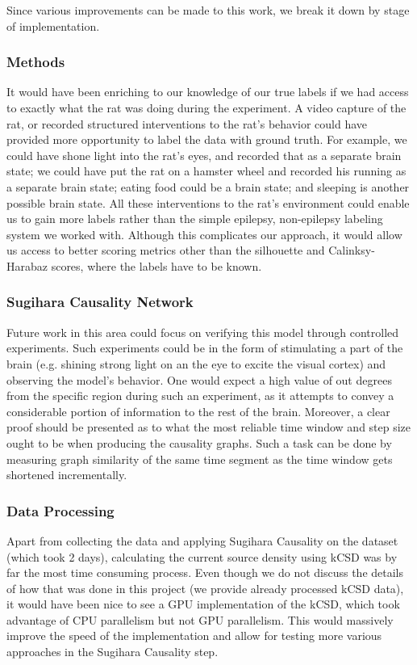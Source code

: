 Since various improvements can be made to this work, we break it down by stage of implementation.

\subsubsection{Methods}
It would have been enriching to our knowledge of our true labels if we had access to exactly what the rat was doing during the experiment. A video capture of the rat, or recorded structured interventions to the rat's behavior could have provided more opportunity to label the data with ground truth. For example, we could have shone light into the rat's eyes, and recorded that as a separate brain state; we could have put the rat on a hamster wheel and recorded his running as a separate brain state; eating food could be a brain state; and sleeping is another possible brain state. All these interventions to the rat's environment could enable us to gain more labels rather than the simple epilepsy, non-epilepsy labeling system we worked with. Although this complicates our approach, it would allow us access to better scoring metrics other than the silhouette and Calinksy-Harabaz scores, where the labels have to be known.

\subsubsection{Sugihara Causality Network}
Future work in this area could focus on verifying this model through controlled experiments. Such experiments could be in the form of stimulating a part of the brain (e.g. shining strong light on an the eye to excite the visual cortex) and observing the model's behavior. One would expect a high value of out degrees from the specific region during such an experiment, as it attempts to convey a considerable portion of information to the rest of the brain. Moreover, a clear proof should be presented as to what the most reliable time window and step size ought to be when producing the causality graphs. Such a task can be done by measuring graph similarity of the same time segment as the time window gets shortened incrementally.

\subsubsection{Data Processing}
Apart from collecting the data and applying Sugihara Causality on the dataset (which took 2 days), calculating the current source density using kCSD was by far the most time consuming process. Even though we do not discuss the details of how that was done in this project (we provide already processed kCSD data), it would have been nice to see a GPU implementation of the kCSD, which took advantage of CPU parallelism but not GPU parallelism. This would massively improve the speed of the implementation and allow for testing more various approaches in the Sugihara Causality step. 

